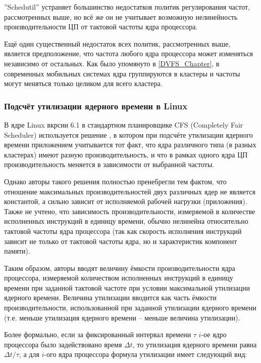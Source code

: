     ''Schedutil'' устраняет большинство недостатков политик регулирования частот, рассмотренных выше,
    но всё же он не учитывает возможную нелинейность производительности ЦП от тактовой частоты ядра
    процессора.

    Ещё один существенный недостаток всех политик, рассмотренных выше, является предположение,
    что частота любого ядра процессора может изменяться независимо от остальных.
    Как было упомянуто в \ref{DVFS_Chapter}, в современных мобильных системах ядра группируются
    в кластеры и частоты могут меняться только целиком для всего кластера.

\subsubsection{Подсчёт утилизации ядерного времени в Linux} \label{linux_util}

    В ядре Linux вкрсии 6.1 в стандартном планировщике CFS (Completely Fair Scheduler)
    используется решение \cite{KernelDocsCapacity}, в котором при подсчёте утилизации ядерного времени
    приложением учитывается тот факт, что ядра различного типа (в разных кластерах) имеют разную
    производительность, и что в рамках одного ядра ЦП производительность меняется
    в зависимости от выбранной частоты.

    Однако авторы такого решения полностью пренебрегли тем фактом, что отношение максимальных
    производительностей двух различных ядер не является константой, а сильно зависит от
    исполняемой рабочей нагрузки (приложения). Также не учтено, что зависимость производительности,
    измеряемой в количестве исполненных инструкций в единицу времени, обычно нелинейна относительно
    тактовой частоты ядра процессора (так как скорость исполнения инструкций зависит не только от
    тактовой частоты ядра, но и характеристик компонент памяти).

    Таким образом, авторы вводят величину ёмкости производительности ядра процессора,
    измеряемой количеством исполненных инструкций в единицу времени при заданной тактовой частоте
    при условии максимальной утилизации ядерного времени. Величина утилизации вводится как часть
    ёмкости производительности, использованной при заданной утилизации ядерного времени (т.е.
    меньше утилизация ядерного времени -- меньше величина утилизации).

    Более формально, если за фиксированный интервал времени $\tau$ $i$-ое ядро процессора было задействовано
    время $\Delta t$, то утилизация ядерного времени равна $\Delta t / \tau$, а для
    $i$-ого ядра процессора формула утилизации имеет следующий вид:

